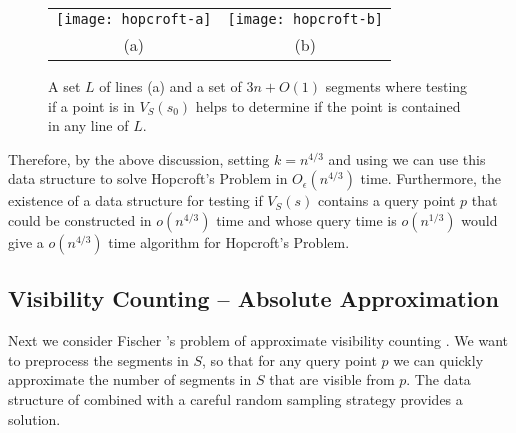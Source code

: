 \documentclass{patmorin}
\newcommand{\Oe}{O_\epsilon}
\begin{document}
\begin{figure}
  \begin{center}
    \begin{tabular}{cc}
      \texttt{[image: hopcroft-a]} &
      \texttt{[image: hopcroft-b]} \\
      (a) & (b)
    \end{tabular}
  \end{center}
  \caption{A set $L$ of lines (a) and a set of $3n+O(1)$ segments where
           testing if a point is in $V_S(s_0)$ helps to determine if
           the point is contained in any line of $L$.}
\end{figure}

Therefore, by the above discussion, setting $k=n^{4/3}$ and using
 we can use this data structure to solve Hopcroft's
Problem in $\Oe(n^{4/3})$ time.  Furthermore, the existence of a data
structure for testing if $V_S(s)$ contains a query point $p$ that could be
constructed in $o(n^{4/3})$ time and whose query time is $o(n^{1/3})$ would
give a $o(n^{4/3})$ time algorithm for Hopcroft's Problem.

\subsection{Visibility Counting -- Absolute Approximation}

Next we consider Fischer \etal's problem of approximate visibility
counting \cite{fhjmz08,fhjmz09}.  We want to preprocess the segments
in $S$, so that for any query point $p$ we can quickly approximate the
number of segments in $S$ that are visible from $p$.  The data structure
of  combined with a careful random sampling strategy
provides a solution. 
\end{document}
